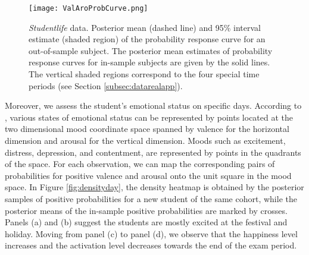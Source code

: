\begin{figure}[t!]
\centering
\texttt{[image: ValAroProbCurve.png]}
\caption{\textit{Studentlife} data. Posterior mean (dashed line) and 95\% interval estimate 
(shaded region) of the probability response curve for an out-of-sample subject. The posterior 
mean estimates of probability response curves for in-sample subjects are given by the solid 
lines. The vertical shaded regions correspond to the four special time periods 
(see Section \ref{subsec:datarealapp}).}
\label{fig:realappprobcurve}
\end{figure}


Moreover, we assess the student's emotional status on specific days. According to 
\citet{Russell1980}, various states of emotional status can be represented by points 
located at the two dimensional mood coordinate space spanned by valence for the horizontal 
dimension and arousal for the vertical dimension. Moods such as excitement, distress, 
depression, and contentment, are represented by points in the quadrants of the space. 
For each observation, we can map the corresponding pairs of probabilities for positive 
valence and arousal onto the unit square in the mood space. In Figure \ref{fig:densityday}, 
the density heatmap is obtained by the posterior samples of positive probabilities for 
a new student of the same cohort, while the posterior means of the in-sample positive 
probabilities are marked by crosses. Panels (a) and (b) suggest the students are mostly 
excited at the festival and holiday. Moving from panel (c) to panel (d), we observe that 
the happiness level increases and the activation level decreases towards the end of the 
exam period. 


